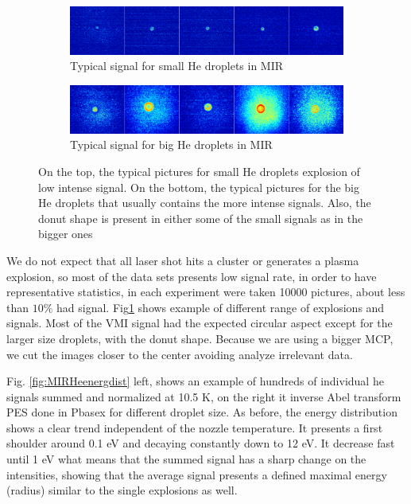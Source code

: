 \begin{figure}[h!]
\centering
\begin{subfigure}[l]{0.7\textwidth}
\caption{Typical signal for small He droplets in MIR}
\includegraphics[width=1\textwidth]{../Images/results/Mir_He_Dropletsize/RAW_MIR_He_smalldroplets.png}   				\end{subfigure}
\begin{subfigure}[l]{0.7\textwidth}
\caption{Typical signal for big He droplets in MIR}
\includegraphics[width=1\textwidth]{../Images/results/Mir_He_Dropletsize/RAW_MIR_He_bigdroplets.png} 
\end{subfigure}

\caption[MIR He raw images]{On the top, the typical pictures for small He droplets explosion of low intense signal. On the bottom, the typical pictures for the big He droplets that usually contains the more intense signals. Also, the donut shape is present in either some of the small signals as in the bigger ones}
\label{fig:MIRHeexample}
\end{figure}

We do not expect that all laser shot hits a cluster or generates a plasma explosion, so  most of the data sets presents low signal rate, in order to have representative statistics, in each experiment were taken 10000 pictures, about less than $10\%$ had signal. Fig\ref{fig:MIRHeexample} shows  example of different range of explosions and signals. Most of the VMI signal had the expected circular aspect except for the larger size droplets, with the donut shape. Because we are using a bigger MCP, we cut the images closer to the center avoiding analyze irrelevant data.

Fig. \ref{fig:MIRHeenergdist} left, shows an example of hundreds of individual he signals summed and normalized at 10.5 K, on the right it inverse Abel transform PES done in Pbasex for different droplet size. As before, the energy distribution shows a clear trend independent of the nozzle temperature. It presents a first shoulder around 0.1 eV and decaying constantly down to 12 eV. It decrease fast until 1 eV what means that the summed signal has a sharp change on the intensities, showing that the average signal presents a defined maximal energy (radius) similar to the single  explosions as well.

